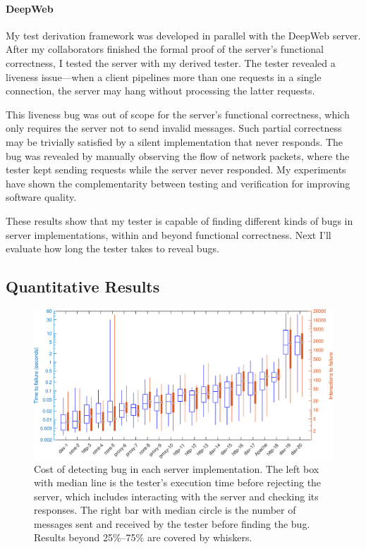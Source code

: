 \paragraph{DeepWeb}
My test derivation framework was developed in parallel with the DeepWeb server.
After my collaborators finished the formal proof of the server's functional
correctness, I tested the server with my derived tester.  The tester
revealed a liveness issue---when a client pipelines more than one requests in a
single connection, the server may hang without processing the latter requests.

This liveness bug was out of scope for the server's functional correctness,
which only requires the server not to send invalid messages.  Such partial
correctness may be trivially satisfied by a silent implementation that never
responds.  The bug was revealed by manually observing the flow of network
packets, where the tester kept sending requests while the server never
responded.  My experiments have shown the complementarity between testing and
verification for improving software quality.

These results show that my tester is capable of finding different kinds of bugs
in server implementations, within and beyond functional correctness.  Next I'll
evaluate how long the tester takes to reveal bugs.

\subsection{Quantitative Results}
\label{sec:http-quant}

\begin{figure}
  \includegraphics[width=\textwidth]{figures/http-time}
  \caption[Cost of detecting bug in each server/mutant.]{Cost of detecting bug
    in each server implementation.  The left box with median line is the
    tester's execution time before rejecting the server, which includes
    interacting with the server and checking its responses.  The right bar with
    median circle is the number of \http messages sent and received by the
    tester before finding the bug.  Results beyond 25\%--75\% are covered by
    whiskers.
  }
  \label{fig:checker-performance}
\end{figure}

